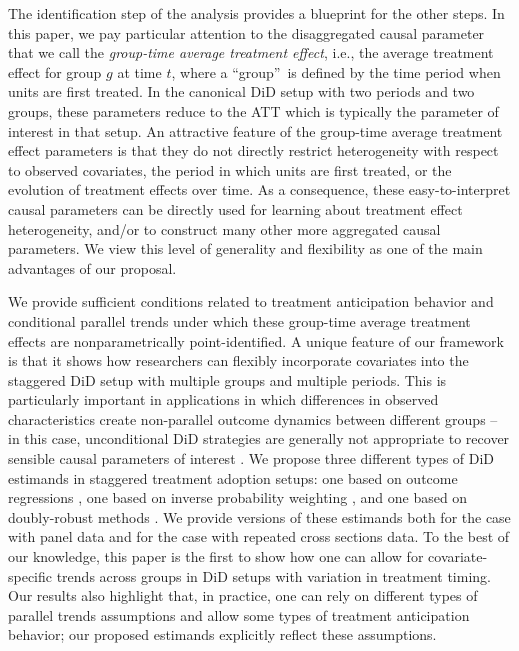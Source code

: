 \documentclass[11pt]{article}%
\theoremstyle{plain}
\numberwithin{sassumption}{section}
\numberwithin{equation}{section}
\begin{document}
The identification step of the analysis provides a blueprint for the other
steps. In this paper, we pay particular attention to the disaggregated causal
parameter that we call the \textit{group-time average treatment effect}, i.e.,
the average treatment effect for group $g$ at time $t$, where a
\textquotedblleft group\textquotedblright\ is defined by the time period when
units are first treated. In the canonical DiD setup with two periods and two
groups, these parameters reduce to the ATT which is typically the parameter of
interest in that setup. An attractive feature of the group-time average
treatment effect parameters is that they do not directly restrict
heterogeneity with respect to observed covariates, the period in which units are first treated, or the evolution of treatment effects over time. As a
consequence, these easy-to-interpret causal parameters can be directly used
for learning about treatment effect heterogeneity, and/or to construct many
other more aggregated causal parameters. We view this level of generality and
flexibility as one of the main advantages of our proposal.

We provide sufficient conditions related to treatment anticipation behavior
and conditional parallel trends under which these group-time average treatment
effects are nonparametrically point-identified. A unique feature of our
framework is that it shows how researchers can flexibly incorporate covariates
into the staggered DiD setup with multiple groups and multiple periods. This
is particularly important in applications in which differences in observed
characteristics create non-parallel outcome dynamics between different groups -- in this case, unconditional DiD strategies are generally not appropriate to 
recover sensible causal parameters of interest
\citep{Heckman1997, Heckman1998,Abadie2005}. We propose three different types
of DiD estimands in staggered treatment adoption setups: one based on outcome
regressions \citep{Heckman1997, Heckman1998}, one based on inverse probability
weighting \citep{Abadie2005}, and one based on doubly-robust methods
\citep{SantAnna2020}. We provide versions of these estimands both for the case
with panel data and for the case with repeated cross sections data. To the
best of our knowledge, this paper is the first to show how one can allow for
covariate-specific trends across groups in DiD setups with variation in
treatment timing. Our results also highlight that, in practice, one can rely
on different types of parallel trends assumptions and allow some types of
treatment anticipation behavior; our proposed estimands explicitly reflect
these assumptions.
\end{document}
